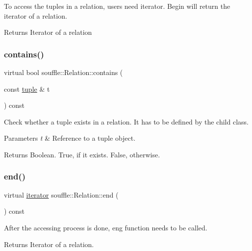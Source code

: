 To access the tuples in a relation, users need iterator. Begin will return the iterator of a relation. \begin{DoxyReturn}{Returns}
Iterator of a relation 
\end{DoxyReturn}
\mbox{\label{classsouffle_1_1_relation_a6f8ce381c8fc38ac6486015c961e3ef6}} 
\subsubsection{\texorpdfstring{contains()}{contains()}}
{\footnotesize\ttfamily virtual bool souffle\+::\+Relation\+::contains (\begin{DoxyParamCaption}\item[{const \hyperlink{classsouffle_1_1tuple}{tuple} \&}]{t }\end{DoxyParamCaption}) const\hspace{0.3cm}{\ttfamily [pure virtual]}}

Check whether a tuple exists in a relation. It has to be defined by the child class. 
\begin{DoxyParams}{Parameters}
{\em t} & Reference to a tuple object. \\
\hline
\end{DoxyParams}
\begin{DoxyReturn}{Returns}
Boolean. True, if it exists. False, otherwise. 
\end{DoxyReturn}
\mbox{\label{classsouffle_1_1_relation_a48aa809188e822ba6a4c7309a9567fbd}} 
\subsubsection{\texorpdfstring{end()}{end()}}
{\footnotesize\ttfamily virtual \hyperlink{classsouffle_1_1_relation_1_1iterator}{iterator} souffle\+::\+Relation\+::end (\begin{DoxyParamCaption}{ }\end{DoxyParamCaption}) const\hspace{0.3cm}{\ttfamily [pure virtual]}}

After the accessing process is done, eng function needs to be called. \begin{DoxyReturn}{Returns}
Iterator of a relation. 
\end{DoxyReturn}
\mbox{\label{classsouffle_1_1_relation_a8e8e6b38e1d621e9cccd365eaedbd7e1}} 
